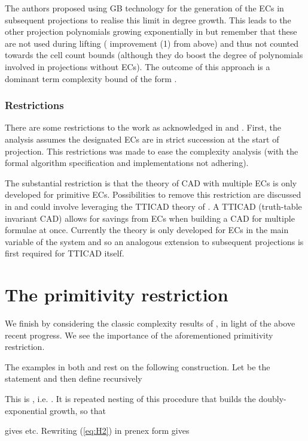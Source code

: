 \documentclass{llncs}
\begin{document}
The authors proposed using GB technology for the generation of the ECs in subsequent projections to realise this limit in degree growth.  This leads to the other projection polynomials growing exponentially in  but remember that these are not used during lifting (\cite{EBD15} improvement (1) from above) and thus not counted towards the cell count bounds (although they do boost the degree of polynomials involved in projections without ECs).  The outcome of this approach is a dominant term complexity bound of the form 
.

\subsubsection*{Restrictions}  There are some restrictions to the work as acknowledged in \cite{EBD15} and \cite{ED16}.  First, the analysis assumes the designated ECs are in strict succession at the start of projection.  This restrictions was made to ease the complexity analysis (with the formal algorithm specification and implementations not adhering).  

The substantial  restriction is that the theory of CAD with multiple ECs is only developed for primitive ECs.  Possibilities to remove this restriction are discussed in \cite{EBD15} and could involve leveraging the TTICAD theory of \cite{BDEMW13} \cite{BDEMW16}.  A TTICAD (truth-table invariant CAD) allows for savings from ECs when building a CAD for multiple formulae at once.  Currently the theory is only developed for ECs in the main variable of the system and so an analogous extension to subsequent projections is first required for TTICAD itself.



\section{The primitivity restriction}
\label{SEC-Primitive}

We finish by considering the classic complexity results of \cite{BD07},\cite{DH88} in light of the above recent progress.  We see the importance of the aforementioned primitivity restriction.

The examples in both \cite{BD07} and \cite{DH88} rest on the following construction.
Let  be the statement  and then define recursively

This is , i.e. . It is repeated nesting of this procedure that builds the doubly-exponential growth, so that 

gives  etc.
Rewriting (\ref{eq:H2}) in prenex form gives 
\end{document}
